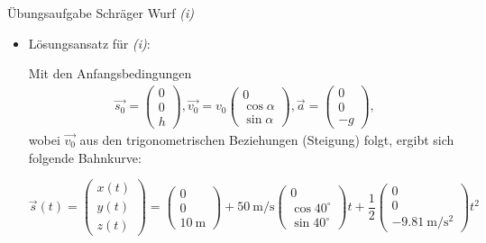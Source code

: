 \documentclass{beamer}
\begin{document}
\begin{frame}{Übungsaufgabe Schräger Wurf \emph{(i)}}
    
    \begin{itemize}
    \item Lösungsansatz für \emph{(i)}:
    
    Mit den Anfangsbedingungen
  \begin{align}
    \vec{s_0} = \begin{pmatrix} 0 \\ 0 \\ h \end{pmatrix},
    \vec{v_0} = v_0 \begin{pmatrix} 0 \\ \cos \alpha \\ \sin \alpha \end{pmatrix},
    \vec{a} = \begin{pmatrix} 0 \\ 0 \\ -g \end{pmatrix},
  \end{align}
    wobei $\vec{v_0}$ aus den trigonometrischen Beziehungen (Steigung) folgt,
    ergibt sich folgende Bahnkurve:

  \begin{equation}
    \vec{s} (t) = \begin{pmatrix} x (t) \\ y (t) \\ z (t) \end{pmatrix} =  
    \begin{pmatrix} 0 \\ 0 \\ \SI{10}{\meter} \end{pmatrix} + 
    \SI{50}{\meter\per\second} \begin{pmatrix} 0 \\ \cos 40^\circ \\ \sin 40^\circ \end{pmatrix} t + 
    \frac{1}{2} \begin{pmatrix} 0 \\ 0 \\ \SI{-9.81}{\meter\per\square\second} \end{pmatrix} t^2
  \end{equation}

    \end{itemize}
\end{frame}
\end{document}
